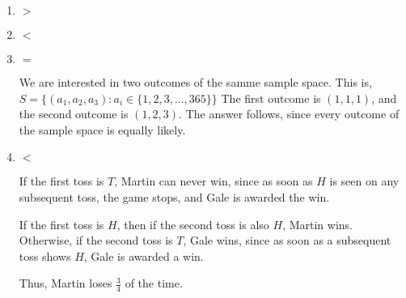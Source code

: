 \begin{enumerate}[label=(\alph*)]

\item $>$

\item $<$

\item $=$

We are interested in two outcomes of the samme sample space. 
This is, $S = \{(a_{1}, a_{2}, a_{3}) : a_{i} \in \{1, 2, 3, ..., 365\}\}$
The first outcome is $(1, 1, 1)$, and the second outcome is $(1, 2, 3)$.
The answer follows, since every outcome of the sample space is equally likely.

\item $<$ 

If the first toss is $T$, Martin can never win, since as soon as $H$ is seen 
on any subsequent toss, the game stops, and Gale is awarded the win.

If the first toss is $H$, then if the second toss is also $H$, Martin wins. 
Otherwise, if the second toss is $T$, Gale wins, since as soon as a subsequent 
toss shows $H$, Gale is awarded a win.

Thus, Martin loses $\frac{3}{4}$ of the time.
\end{enumerate}